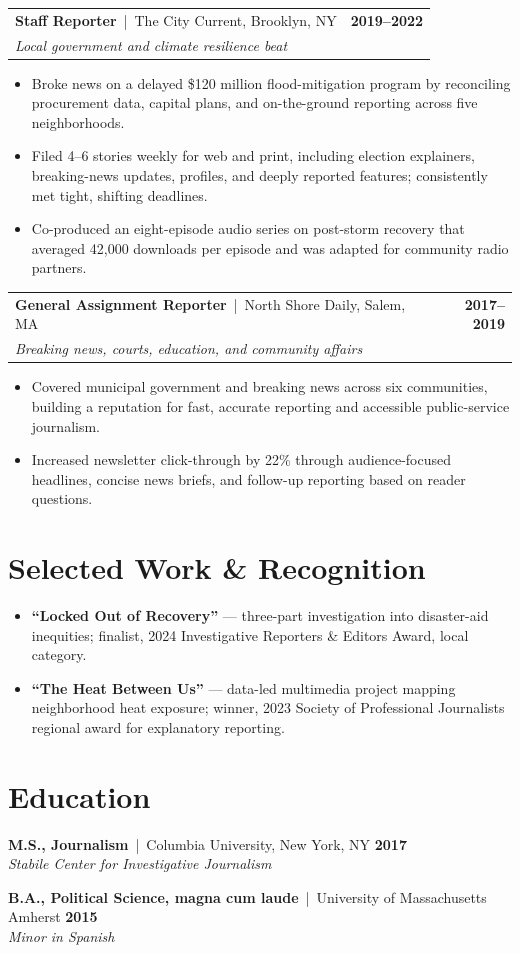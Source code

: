 \documentclass[10pt,letterpaper]{article}
\makeatletter
\newcommand{\role}[4]{%
  \begin{tabularx}{\textwidth}{@{}>{\raggedright\arraybackslash}Xr@{}}
    \textbf{#1} \textcolor{muted}{\,|\, #2} & \textbf{#3} \\
    \textit{#4} &
  \end{tabularx}\vspace{-3pt}
}
\newcommand{\education}[4]{%
  \textbf{#1} \textcolor{muted}{\,|\, #2}%
  \hfill\textbf{#3}\\[-1pt]
  \textit{#4}\par
}
\makeatother
\begin{document}
\role{Staff Reporter}{The City Current, Brooklyn, NY}{2019--2022}{Local government and climate resilience beat}
\begin{itemize}
  \item Broke news on a delayed \$120 million flood-mitigation program by reconciling procurement data, capital plans, and on-the-ground reporting across five neighborhoods.
  \item Filed 4--6 stories weekly for web and print, including election explainers, breaking-news updates, profiles, and deeply reported features; consistently met tight, shifting deadlines.
  \item Co-produced an eight-episode audio series on post-storm recovery that averaged 42,000 downloads per episode and was adapted for community radio partners.
\end{itemize}

\role{General Assignment Reporter}{North Shore Daily, Salem, MA}{2017--2019}{Breaking news, courts, education, and community affairs}
\begin{itemize}
  \item Covered municipal government and breaking news across six communities, building a reputation for fast, accurate reporting and accessible public-service journalism.
  \item Increased newsletter click-through by 22\% through audience-focused headlines, concise news briefs, and follow-up reporting based on reader questions.
\end{itemize}

\section*{Selected Work \& Recognition}
\begin{itemize}
  \item \textbf{``Locked Out of Recovery''} --- three-part investigation into disaster-aid inequities; finalist, 2024 Investigative Reporters \& Editors Award, local category.
  \item \textbf{``The Heat Between Us''} --- data-led multimedia project mapping neighborhood heat exposure; winner, 2023 Society of Professional Journalists regional award for explanatory reporting.
\end{itemize}

\section*{Education}
\education{M.S., Journalism}{Columbia University, New York, NY}{2017}{Stabile Center for Investigative Journalism}
\vspace{1pt}
\education{B.A., Political Science, magna cum laude}{University of Massachusetts Amherst}{2015}{Minor in Spanish}
\end{document}
